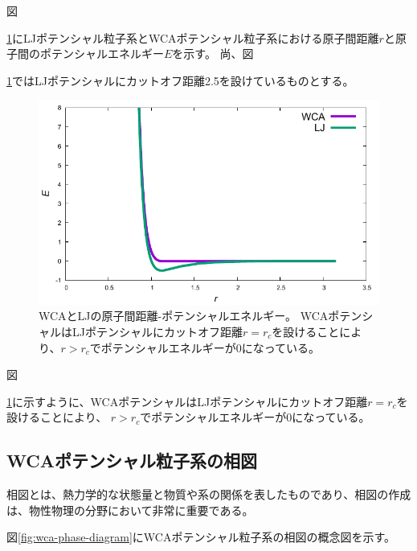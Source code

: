\documentclass[titlepage]{jsreport}
\begin{document}
図{\ref{fig:dis-poen}にLJポテンシャル粒子系とWCAポテンシャル粒子系における原子間距離$r$と原子間のポテンシャルエネルギー$E$を示す。
尚、図{\ref{fig:dis-poen}ではLJポテンシャルにカットオフ距離2.5を設けているものとする。

\newpage
\begin{figure}[htbp]
    \begin{center}
        \includegraphics[width=14cm]{fig/dis-poen.pdf}
    \end{center}
    \caption{WCAとLJの原子間距離-ポテンシャルエネルギー。
    WCAポテンシャルはLJポテンシャルにカットオフ距離$r=r_c$を設けることにより、$r>r_c$でポテンシャルエネルギーが0になっている。}
    \label{fig:dis-poen}
\end{figure}

図{\ref{fig:dis-poen}に示すように、WCAポテンシャルはLJポテンシャルにカットオフ距離$r=r_c$を設けることにより、
$r>r_c$でポテンシャルエネルギーが0になっている。


\subsection{WCAポテンシャル粒子系の相図}\label{method-subsec:WCA-phase}
相図とは、熱力学的な状態量と物質や系の関係を表したものであり、相図の作成は、物性物理の分野において非常に重要である\cite{gaussian-phase}。

図\ref{fig:wca-phase-diagram}にWCAポテンシャル粒子系の相図の概念図を示す。

}}}
\end{document}
